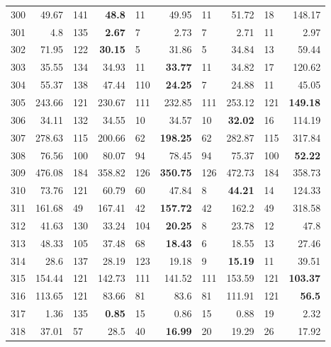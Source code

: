 \begin{longtable}{lr@{\hskip 4pt}l@{\hskip 12pt}r@{\hskip 4pt}l@{\hskip 12pt}r@{\hskip 4pt}l@{\hskip 12pt}r@{\hskip 4pt}l@{\hskip 12pt}r}
300 & 49.67 & 141 & \textbf{48.8} & 11 & 49.95 & 11 & 51.72 & 18 & 148.17 \\
301 & 4.8 & 135 & \textbf{2.67} & 7 & 2.73 & 7 & 2.71 & 11 & 2.97 \\
302 & 71.95 & 122 & \textbf{30.15} & 5 & 31.86 & 5 & 34.84 & 13 & 59.44 \\
303 & 35.55 & 134 & 34.93 & 11 & \textbf{33.77} & 11 & 34.82 & 17 & 120.62 \\
304 & 55.37 & 138 & 47.44 & 110 & \textbf{24.25} & 7 & 24.88 & 11 & 45.05 \\
305 & 243.66 & 121 & 230.67 & 111 & 232.85 & 111 & 253.12 & 121 & \textbf{149.18} \\
306 & 34.11 & 132 & 34.55 & 10 & 34.57 & 10 & \textbf{32.02} & 16 & 114.19 \\
307 & 278.63 & 115 & 200.66 & 62 & \textbf{198.25} & 62 & 282.87 & 115 & 317.84 \\
308 & 76.56 & 100 & 80.07 & 94 & 78.45 & 94 & 75.37 & 100 & \textbf{52.22} \\
309 & 476.08 & 184 & 358.82 & 126 & \textbf{350.75} & 126 & 472.73 & 184 & 358.73 \\
310 & 73.76 & 121 & 60.79 & 60 & 47.84 & 8 & \textbf{44.21} & 14 & 124.33 \\
311 & 161.68 & 49 & 167.41 & 42 & \textbf{157.72} & 42 & 162.2 & 49 & 318.58 \\
312 & 41.63 & 130 & 33.24 & 104 & \textbf{20.25} & 8 & 23.78 & 12 & 47.8 \\
313 & 48.33 & 105 & 37.48 & 68 & \textbf{18.43} & 6 & 18.55 & 13 & 27.46 \\
314 & 28.6 & 137 & 28.19 & 123 & 19.18 & 9 & \textbf{15.19} & 11 & 39.51 \\
315 & 154.44 & 121 & 142.73 & 111 & 141.52 & 111 & 153.59 & 121 & \textbf{103.37} \\
316 & 113.65 & 121 & 83.66 & 81 & 83.6 & 81 & 111.91 & 121 & \textbf{56.5} \\
317 & 1.36 & 135 & \textbf{0.85} & 15 & 0.86 & 15 & 0.88 & 19 & 2.32 \\
318 & 37.01 & 57 & 28.5 & 40 & \textbf{16.99} & 20 & 19.29 & 26 & 17.92 \\
\bottomrule
\end{longtable}